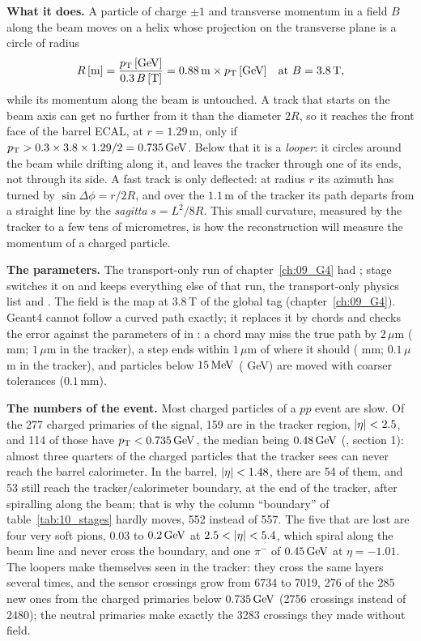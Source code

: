 \textbf{What it does.} A particle of charge $\pm1$ and transverse momentum \pt{} in a field $B$ along the beam
moves on a helix whose projection on the transverse plane is a circle of radius
\[ R\,[\mathrm{m}] = \frac{p_{\mathrm{T}}\,[\mathrm{GeV}]}{0.3\,B\,[\mathrm{T}]} = 0.88\,\mathrm{m}\times p_{\mathrm{T}}\,[\mathrm{GeV}]
\quad\text{at } B=3.8\,\mathrm{T}, \]
while its momentum along the beam is untouched. A track that starts on the beam axis can get no further from it
than the diameter $2R$, so it reaches the front face of the barrel ECAL, at $r=1.29$\,m, only if
$p_{\mathrm{T}} > 0.3\times3.8\times1.29/2 = 0.735\,\mathrm{GeV}$. Below that it is a \emph{looper}: it circles around the beam while
drifting along it, and leaves the tracker through one of its ends, not through its side. A fast track is only
deflected: at radius $r$ its azimuth has turned by $\sin\Delta\phi = r/2R$, and over the $1.1$\,m of the tracker its
path departs from a straight line by the \emph{sagitta} $s = L^2/8R$. This small curvature, measured by the tracker
to a few tens of micrometres, is how the reconstruction will measure the momentum of a charged particle.

\textbf{The parameters.} The transport-only run of chapter~\ref{ch:09_G4} had ;
stage  switches it on and keeps everything else of that run, the transport-only physics list and
. The field is the map  at $3.8$\,T of the global tag
(chapter~\ref{ch:09_G4}). Geant4 cannot follow a curved path exactly; it replaces it by chords and checks the error
against the parameters of  in :
a chord may miss the true path by $2\,\mu$m ( mm; $1\,\mu$m in the tracker), a step ends
within $1\,\mu$m of where it should ( mm; $0.1\,\mu$m in the tracker), and particles
below $15\,\mathrm{MeV}$ ( GeV) are moved with coarser tolerances ($0.1$\,mm).

\textbf{The numbers of the event.} Most charged particles of a $pp$ event are slow. Of the 277 charged primaries of
the signal, 159 are in the tracker region, $|\eta|<2.5$, and 114 of those have $p_{\mathrm{T}}<0.735\,\mathrm{GeV}$, the median being
$0.48\,\mathrm{GeV}$ (, section 1): almost three quarters of the charged particles that the tracker sees can
never reach the barrel calorimeter. In the barrel, $|\eta|<1.48$, there are 54 of them, and 53 still reach the
tracker/calorimeter boundary, at the end of the tracker, after spiralling along the beam; that is why the column
``boundary'' of table~\ref{tab:10_stages} hardly moves, 552 instead of 557. The five that are lost are four very
soft pions, $0.03$ to $0.2\,\mathrm{GeV}$ at $2.5<\abseta<5.4$, which spiral along the beam line and never cross the boundary,
and one $\pi^-$ of $0.45\,\mathrm{GeV}$ at $\eta=-1.01$. The loopers make themselves seen in the tracker: they cross the same layers several times,
and the sensor crossings grow from 6734 to 7019, 276 of the 285 new ones from the charged primaries below
$0.735\,\mathrm{GeV}$ (2756 crossings instead of 2480); the neutral primaries make exactly the 3283 crossings they made without
field.

